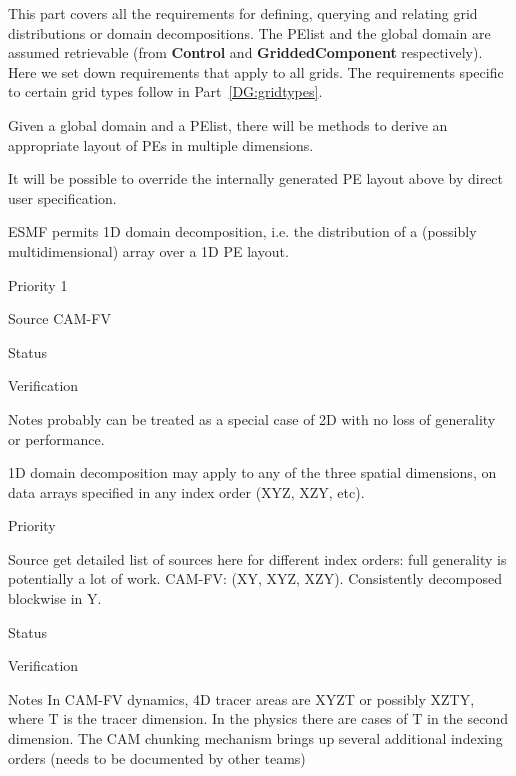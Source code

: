 
This part covers all the requirements for defining, querying and
relating grid distributions or domain decompositions. The PElist and
the global domain are assumed retrievable (from \textbf{Control} and
\textbf{GriddedComponent} respectively). Here we set down requirements
that apply to all grids. The requirements specific to certain grid
types follow in Part~\ref{DG:gridtypes}.



Given a global domain and a PElist, there will be methods to derive an
appropriate layout of PEs in multiple dimensions.


It will be possible to override the internally generated PE layout above
by direct user specification.


ESMF permits 1D domain decomposition, i.e. the distribution of a
(possibly multidimensional) array over a 1D PE layout.

\begin{reqlist}
\item[Priority] 1
\item[Source] CAM-FV
\item[Status]
\item[Verification]
\item[Notes] probably can be treated as a special case of 2D with no
  loss of generality or performance.
\end{reqlist}


1D domain decomposition may apply to any of the three spatial
dimensions, on data arrays specified in any index order (XYZ, XZY,
etc).

\begin{reqlist}
\item[Priority]
\item[Source] get detailed list of sources here for different index
  orders: full generality is potentially a lot of work.
 CAM-FV: (XY, XYZ, XZY).  Consistently decomposed blockwise in Y.
\item[Status]
\item[Verification]
\item[Notes]  In CAM-FV dynamics, 4D tracer areas are XYZT or
	possibly XZTY, where T is the tracer dimension.  In the physics
	there are cases of T in the second dimension.  The CAM
	chunking mechanism brings up several additional indexing
	orders (needs to be documented by other teams)
\end{reqlist}

